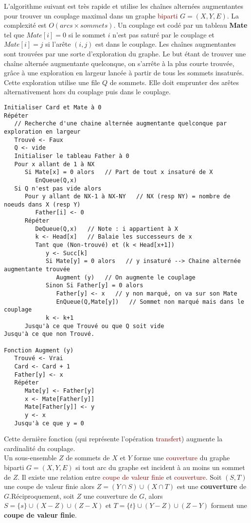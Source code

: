\documentclass{article}
\newcommand{\red}[1]{\textcolor{darkred}{#1}}
\begin{document}
L’algorithme suivant est très rapide et utilise les chaînes alternées augmentantes pour trouver un couplage maximal dans un graphe \red{biparti} $G=(X,Y,E)$. La complexité est 
$O(arcs \times sommets)$. Un couplage est codé par un tableau \textbf{Mate} tel que $Mate[i]=0$ si le sommet $i$ n’est pas saturé par le couplage et $Mate[i]=j$ si l’arête 
$(i,j)$ est dans le couplage. Les chaînes augmentantes sont trouvées par une sorte d’exploration du graphe. Le but étant de trouver une chaîne alternée augmentante quelconque, on 
s’arrête à la plus courte trouvée, grâce à une exploration en largeur lancée à partir de tous les sommets insaturés. Cette exploration utilise une file $Q$ de sommets. Elle doit 
emprunter des arêtes alternativement hors du couplage puis dans le couplage.
\begin{verbatim}
Initialiser Card et Mate à 0
Répéter
   // Recherche d'une chaine alternée augmentante quelconque par exploration en largeur
   Trouvé <- Faux
   Q <- vide
   Initialiser le tableau Father à 0
   Pour x allant de 1 à NX
      Si Mate[x] = 0 alors   // Part de tout x insaturé de X
         EnQueue(Q,x)
   Si Q n'est pas vide alors
      Pour y allant de NX-1 à NX-NY   // NX (resp NY) = nombre de noeuds dans X (resp Y)
         Father[i] <- 0
      Répéter
         DeQueue(Q,x)   // Note : i appartient à X
         k <- Head[x]   // Balaie les successeurs de x
         Tant que (Non-trouvé) et (k < Head[x+1])
            y <- Succ[k]
            Si Mate[y] = 0 alors   // y insaturé --> Chaine alternée augmentante trouvée
               Augment (y)   // On augmente le couplage
            Sinon Si Father[y] = 0 alors
               Father[y] <- x   // y non marqué, on va sur son Mate
               EnQueue(Q,Mate[y])   // Sommet non marqué mais dans le couplage
            k <- k+1
      Jusqu'à ce que Trouvé ou que Q soit vide
Jusqu'à ce que non Trouvé.

Fonction Augment (y)
   Trouvé <- Vrai
   Card <- Card + 1
   Father[y] <- x
   Répéter
      Mate[y] <- Father[y]
      x <- Mate[Father[y]]
      Mate[Father[y]] <- y
      y <- x
   Jusqu'à ce que y = 0
\end{verbatim}
Cette dernière fonction (qui représente l'opération \red{transfert}) augmente la cardinalité du couplage. \\

Un sous-ensemble $Z$ de sommets de $X$ et $Y$ forme une \red{couverture} du graphe biparti $G=(X,Y,E)$ si tout arc du graphe est incident à au moins un sommet de $Z$. Il 
existe une relation entre \red{coupe de valeur finie} et \red{couverture}. Soit $(S,T)$ une coupe de valeur finie alors $Z =(Y\cap S)\cup (X\cap T)$ est une \textbf{couverture}
de $G$.Réciproquement, soit $Z$ une couverture de $G$, alors $S =\{s\}\cup(X-Z)\cup(Z-X)$ et $T =\{t\}\cup(Y-Z)\cup(Z-Y)$ forment une \textbf{coupe de valeur finie}.
\end{document}
